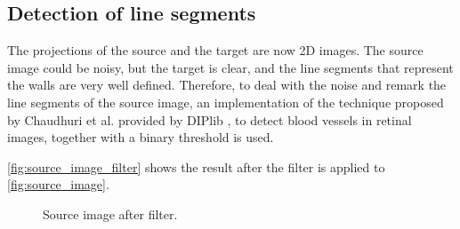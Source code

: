         \subsection{Detection of line segments}
            The projections of the source and the target are now 2D images. 
            The source image could be noisy, but the target is clear, and the line segments that represent the walls are very well defined.
            Therefore, to deal with the noise and remark the line segments of the source image, an implementation of the technique proposed 
            by Chaudhuri et al. \cite{Chaudhuri_1989_detection} provided by DIPlib \cite{DIPlib_library}, 
            to detect blood vessels in retinal images, together with a binary threshold is used. 
            
            \autoref{fig:source_image_filter} shows the result after the filter is applied to \autoref{fig:source_image}.
            
            \begin{figure}[htp]
                \centering
                \caption{Source image after filter.}
                \label{fig:source_image_filter}
            \end{figure}

